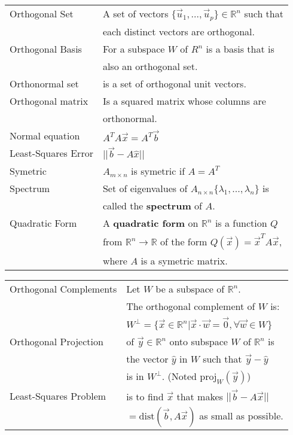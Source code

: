 \documentclass[5pt]{article}
\begin{document}
\begin{multicols}{2}
\begin{tabular}{ll}
Orthogonal Set        & A set  of vectors $\{\vec{u}_1, ..., \vec{u}_p\}\in\mathbb{R}^n$ such that\\ 
                      & each distinct vectors are orthogonal.\\
Orthogonal Basis      & For a subspace $W$ of $R^n$ is a basis that is\\
                      & also an orthogonal set.\\
Orthonormal set       & is a set  of  orthogonal unit vectors.\\
Orthogonal matrix     & Is a squared matrix whose columns are\\
                      & orthonormal.\\
Normal equation       & $A^TA\vec{x}=A^T\vec{b}$\\
Least-Squares Error   & $||\vec{b}-A\hat{x}||$\\
Symetric              & $A_{m\times n}$ is symetric if $A=A^T$\\
Spectrum              & Set of eigenvalues of $A_{n\times n}\{\lambda_1,...,\lambda_n\}$ is\\
                      & called the \textbf{spectrum} of $A$.\\
Quadratic Form        & A \textbf{quadratic form} on $\mathbb{R}^n$ is a function $Q$ \\
                      & from $\mathbb{R}^n\rightarrow\mathbb{R}$ of the form $Q(\vec{x})=\vec{x}^TA\vec{x}$,\\
                      & where $A$ is a symetric matrix.
\end{tabular}
\begin{tabular}{ll}
Orthogonal Complements  & Let $W$ be a subspace of $\mathbb{R}^n$.\\
                        & The orthogonal complement of $W$ is: \\
                        & $W^\perp=\{\vec{x}\in\mathbb{R}^n|\vec{x}\cdot\vec{w}=\vec{0}, \forall\vec{w}\in W\}$\\
Orthogonal Projection   & of $\vec{y}\in\mathbb{R}^n$ onto subspace $W$ of $\mathbb{R}^n$ is\\
                        & the vector $\hat{y}$ in $W$ such that $\vec{y} -\hat{y}$ \\
                        & is in $W^\perp$. (Noted $\text{proj}_W(\vec{y})$)\\
Least-Squares Problem   & is to find $\vec{x}$ that makes $||\vec{b}-A\vec{x}||$ \\
                        & $=\text{dist}(\vec{b},A\vec{x})$ as small as possible. 

\end{tabular}
\end{multicols}
\end{document}
